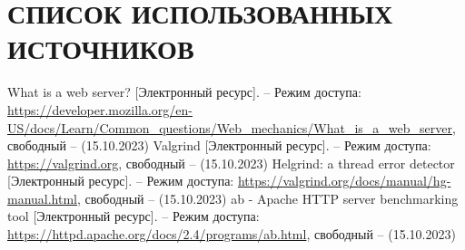 \section*{СПИСОК ИСПОЛЬЗОВАННЫХ ИСТОЧНИКОВ}

\begingroup
\renewcommand{\section}[2]{}
\begin{thebibliography}{}
	What is a web server? [Электронный ресурс]. – Режим доступа: 
	\url{https://developer.mozilla.org/en-US/docs/Learn/Common\_questions/Web\_mechanics/What\_is\_a\_web\_server},
	свободный – (15.10.2023)
	Valgrind [Электронный ресурс]. – Режим доступа: 
	\url{https://valgrind.org},
	свободный – (15.10.2023)
	Helgrind: a thread error detector [Электронный ресурс]. – Режим доступа: 
	\url{https://valgrind.org/docs/manual/hg-manual.html},
	свободный – (15.10.2023)
	ab - Apache HTTP server benchmarking tool [Электронный ресурс]. – Режим доступа: 
	\url{https://httpd.apache.org/docs/2.4/programs/ab.html},
	свободный – (15.10.2023)
	
	
\end{thebibliography}
\endgroup

\pagebreak